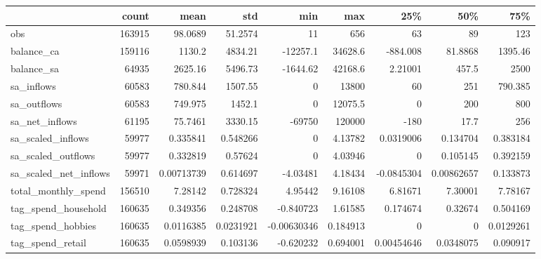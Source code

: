 \begin{tabular}{lrrrrrrrr}
\toprule
                         &   count &          mean &          std &             min &           max &           25\% &          50\% &          75\% \\
\midrule
 obs                     &  163915 &   98.0689     &   51.2574    &     11          &    656        &   63          &  89          &  123         \\
 balance\_ca              &  159116 & 1130.2        & 4834.21      & -12257.1        &  34628.6      & -884.008      &  81.8868     & 1395.46      \\
 balance\_sa              &   64935 & 2625.16       & 5496.73      &  -1644.62       &  42168.6      &    2.21001    & 457.5        & 2500         \\
 sa\_inflows              &   60583 &  780.844      & 1507.55      &      0          &  13800        &   60          & 251          &  790.385     \\
 sa\_outflows             &   60583 &  749.975      & 1452.1       &      0          &  12075.5      &    0          & 200          &  800         \\
 sa\_net\_inflows          &   61195 &   75.7461     & 3330.15      & -69750          & 120000        & -180          &  17.7        &  256         \\
 sa\_scaled\_inflows       &   59977 &    0.335841   &    0.548266  &      0          &      4.13782  &    0.0319006  &   0.134704   &    0.383184  \\
 sa\_scaled\_outflows      &   59977 &    0.332819   &    0.57624   &      0          &      4.03946  &    0          &   0.105145   &    0.392159  \\
 sa\_scaled\_net\_inflows   &   59971 &    0.00713739 &    0.614697  &     -4.03481    &      4.18434  &   -0.0845304  &   0.00862657 &    0.133873  \\
 total\_monthly\_spend     &  156510 &    7.28142    &    0.728324  &      4.95442    &      9.16108  &    6.81671    &   7.30001    &    7.78167   \\
 tag\_spend\_household     &  160635 &    0.349356   &    0.248708  &     -0.840723   &      1.61585  &    0.174674   &   0.32674    &    0.504169  \\
 tag\_spend\_hobbies       &  160635 &    0.0116385  &    0.0231921 &     -0.00630346 &      0.184913 &    0          &   0          &    0.0129261 \\
 tag\_spend\_retail        &  160635 &    0.0598939  &    0.103136  &     -0.620232   &      0.694001 &    0.00454646 &   0.0348075  &    0.090917  \\

\end{tabular}

